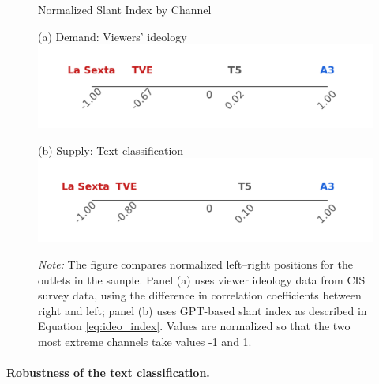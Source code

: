 \documentclass[12pt]{article}
\begin{document}
		\begin{figure}[!htbp]
		\centering
		\caption{Normalized Slant Index by Channel}

		\begin{minipage}[t]{0.49\textwidth}
			\centering
					(a) Demand: Viewers' ideology
		\includegraphics[width=\linewidth]{figures/congress_line_cis}
		\end{minipage}
		\hfill
		\begin{minipage}[t]{0.49\textwidth}
			\centering

			
				(b) Supply: Text classification
			\includegraphics[width=\linewidth]{figures/congress_line_chatgpt}
			
			
		\end{minipage}
		
		
		\caption*{\small \textit{Note:} The figure compares normalized left–right positions for the outlets in the sample. Panel (a) uses viewer ideology data from CIS survey data, using the difference in correlation coefficients between right and left; panel (b) uses GPT-based slant index as described in Equation \ref{eq:ideo_index}. Values are normalized so that the two most extreme channels take values -1 and 1. }
		\label{fig:channel_ideology_lines}
	\end{figure}
	
	\FloatBarrier
	
	\paragraph{Robustness of the text classification.}
	
\end{document}
